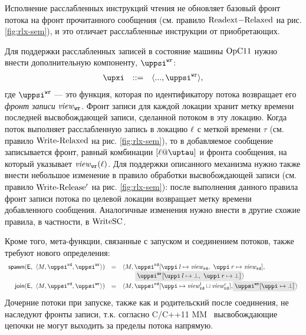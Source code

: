 Исполнение расслабленных инструкций чтения не обновляет
базовый фронт потока на фронт прочитанного сообщения
(см. правило ${\rm Read	ext{-}Relaxed}$ на рис. \ref{fig:rlx-sem}), и это отличает
расслабленные инструкции от приобретающих.

Для поддержки расслабленных записей в состояние машины $\mathrm{OpC11}$ нужно внести дополнительную компоненту, $\stPsiWrite$:
%
\[\begin{array}{rcl}
\auxX      & ::= & \angled{..., \stPsiWrite},
\end{array}\]
%
где $\stPsiWrite$ --- это функция, которая по идентификатору потока возвращает его \emph{фронт записи} $\mathit{view}_{\text{\scriptsize{\texttt{wr}}}}$.
Фронт записи для каждой локации хранит метку времени последней высвобождающей записи, сделанной потоком в эту локацию.
Когда поток выполняет расслабленную запись в локацию $\ell$ с меткой времени $\tau$
(см. правило ${\rm Write\text{-}Relaxed}$ на рис. \ref{fig:rlx-sem}),
то в добавляемое сообщение записывается фронт, равный комбинации $[\loc@\tau]$ и фронта сообщения, на который указывает
$\mathit{view}_{\text{\scriptsize{\texttt{wr}}}}(\ell)$.
Для поддержки описанного механизма нужно также внести небольшое изменение в правило обработки высвобождающей записи
(см. правило ${\rm Write\text{-}Release'}$ на рис. \ref{fig:rlx-sem}): после выполнения данного правила фронт записи потока
по целевой локации возвращает метку времени добавленного сообщения. Аналогичные изменения нужно внести в другие
схожие правила, в частности, в ${\rm WriteSC}$.

Кроме того, мета-функции, связанные с запуском и соединением потоков, также требуют нового определения:
\[
\begin{array}{r c l}
\spawn{\EvalContext}{\angled{\stEta,\stPsiRead,\stPsiWrite}} & = &
\angled{\stEta,
\stPsiRead[\stpath\:l \mapsto \stSigmaRead,~\stpath\:r \mapsto \stSigmaRead], \\
& & \quad ~~~ \graybox{\stPsiWrite[\stpath\:l \mapsto \bot,~\stpath\:r \mapsto \bot]}} \\

\joinP{\EvalContext}{\angled{\stEta, \stPsiRead, \stPsiWrite}} & = &
\angled{\stEta, \stPsiRead[\stpath \mapsto \stSigmaRead^{l} \sqcup \stSigmaRead^{r}],
  \graybox{\stPsiWrite[\stpath \mapsto \bot]}}
\end{array}
\]
Дочерние потоки при запуске, также как и родительский после соединения, не наследуют
фронты записи, т.к. согласно C/C++11 MM~\cite{Batty-al:POPL11}
высвобождающие цепочки не могут выходить за пределы потока напрямую.

